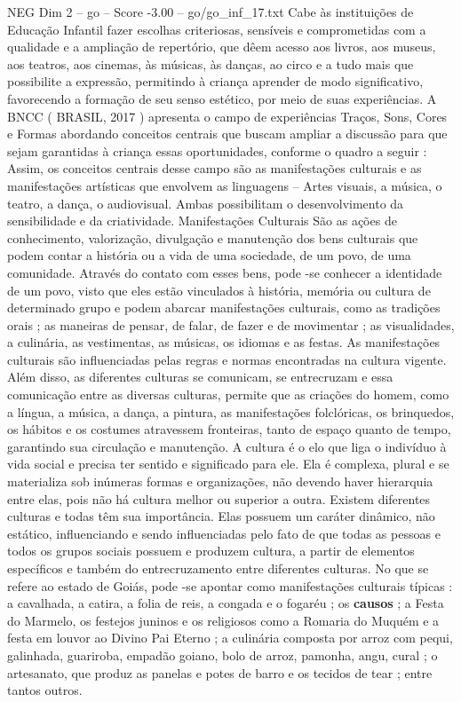 \begin{textsample}{NEG Dim 2 – go – Score -3.00 – go/go\_inf\_17.txt}
Cabe às instituições de Educação Infantil fazer escolhas criteriosas, sensíveis e comprometidas com a qualidade e a ampliação de repertório, que dêem acesso aos livros, aos museus, aos teatros, aos cinemas, às músicas, às danças, ao circo e a tudo mais que possibilite a expressão, permitindo à criança aprender de modo significativo, favorecendo a formação de seu senso estético, por meio de suas experiências.
A BNCC ( BRASIL, 2017 ) apresenta o campo de experiências Traços, Sons, Cores e Formas abordando conceitos centrais que buscam ampliar a discussão para que sejam garantidas à criança essas oportunidades, conforme o quadro a seguir : Assim, os conceitos centrais desse campo são as manifestações culturais e as manifestações artísticas que envolvem as linguagens – Artes visuais, a música, o teatro, a dança, o audiovisual.
Ambas possibilitam o desenvolvimento da sensibilidade e da criatividade.
Manifestações Culturais São as ações de conhecimento, valorização, divulgação e manutenção dos bens culturais que podem contar a história ou a vida de uma sociedade, de um povo, de uma comunidade.
Através do contato com esses bens, pode -se conhecer a identidade de um povo, visto que eles estão vinculados à história, memória ou cultura de determinado grupo e podem abarcar manifestações culturais, como as tradições orais ; as maneiras de pensar, de falar, de fazer e de movimentar ; as visualidades, a culinária, as vestimentas, as músicas, os idiomas e as festas.
As manifestações culturais são influenciadas pelas regras e normas encontradas na cultura vigente.
Além disso, as diferentes culturas se comunicam, se entrecruzam e essa comunicação entre as diversas culturas, permite que as criações do homem, como a língua, a música, a dança, a pintura, as manifestações folclóricas, os brinquedos, os hábitos e os costumes atravessem fronteiras, tanto de espaço quanto de tempo, garantindo sua circulação e manutenção.
A cultura é o elo que liga o indivíduo à vida social e precisa ter sentido e significado para ele.
Ela é complexa, plural e se materializa sob inúmeras formas e organizações, não devendo haver hierarquia entre elas, pois não há cultura melhor ou superior a outra.
Existem diferentes culturas e todas têm sua importância.
Elas possuem um caráter dinâmico, não estático, influenciando e sendo influenciadas pelo fato de que todas as pessoas e todos os grupos sociais possuem e produzem cultura, a partir de elementos específicos e também do entrecruzamento entre diferentes culturas.
No que se refere ao estado de Goiás, pode -se apontar como manifestações culturais típicas : a cavalhada, a catira, a folia de reis, a congada e o fogaréu ; os \textbf{causos} ; a Festa do Marmelo, os festejos juninos e os religiosos como a Romaria do Muquém e a festa em louvor ao Divino Pai Eterno ; a culinária composta por arroz com pequi, galinhada, guariroba, empadão goiano, bolo de arroz, pamonha, angu, cural ; o artesanato, que produz as panelas e potes de barro e os tecidos de tear ; entre tantos outros.

\end{textsample}
